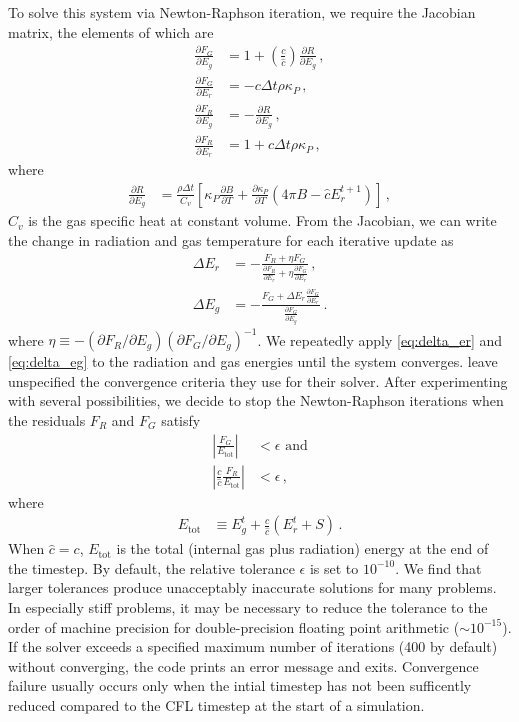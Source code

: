 \documentclass[fleqn,usenatbib]{mnras}
\begin{document}
To solve this system via Newton-Raphson iteration, we require the Jacobian matrix, the elements of which are
\begin{align}
\frac{\partial F_G}{\partial E_g} &= 1 + \left( \frac{c}{\hat c} \right) \frac{\partial R}{\partial E_g} \, , \\
\frac{\partial F_G}{\partial E_r} &= -c \Delta t \rho \kappa_P \, , \\
\frac{\partial F_R}{\partial E_g} &= -\frac{\partial R}{\partial E_g} \, , \\
\frac{\partial F_R}{\partial E_r} &= 1 + \hat c \Delta t \rho \kappa_P \, ,
\end{align}
where
\begin{align}
\frac{\partial R}{\partial E_g} &= \frac{\rho \Delta t}{C_v} \left[ \kappa_P \frac{\partial B}{\partial T} + \frac{\partial \kappa_P}{\partial T} \left( 4\pi B - \hat c E_r^{t+1} \right) \right] \, ,
\end{align}
$C_v$ is the gas specific heat at constant volume. From the Jacobian, we can write the change in radiation and gas temperature for each iterative update as
\begin{align}
\label{eq:delta_er}
\Delta E_r &= -\frac{F_R + \eta F_G}{ \frac{\partial F_R}{\partial E_r} + \eta \frac{\partial F_G}{\partial E_r} } \, , \\ 
\label{eq:delta_eg}
\Delta E_g &= -\frac{F_G + \Delta E_r \frac{\partial F_G}{\partial E_r}}{ \frac{\partial F_G}{\partial E_g} } \, .
\end{align}
where $\eta \equiv - (\partial F_R/\partial E_g) ( \partial F_G/\partial E_g )^{-1}$. We repeatedly apply \autoref{eq:delta_er} and \autoref{eq:delta_eg} to the radiation and gas energies until the system converges. \citet{Howell_2003} leave unspecified the convergence criteria they use for their solver. After experimenting with several possibilities, we decide to stop the Newton-Raphson iterations when the residuals $F_R$ and $F_G$ satisfy
\begin{align}
\left| \frac{F_G}{E_{\text{tot}}} \right| &< \epsilon \, \, \text{and} \\
\left| \frac{c}{\hat c} \frac{F_R}{E_{\text{tot}}} \right| &< \epsilon \, ,
\end{align}
where
\begin{align}
E_{\text{tot}} &\equiv E_g^t + \frac{c}{\hat c} \left( E_r^t + S \right) \, .
\end{align}
When $\hat c = c$, $E_{\text{tot}}$ is the total (internal gas plus radiation) energy at the end of the timestep. By default, the relative tolerance $\epsilon$ is set to $10^{-10}$. We find that larger tolerances produce unacceptably inaccurate solutions for many problems. In especially stiff problems, it may be necessary to reduce the tolerance to the order of machine precision for double-precision floating point arithmetic ($\sim 10^{-15}$). If the solver exceeds a specified maximum number of iterations (400 by default) without converging, the code prints an error message and exits. Convergence failure usually occurs only when the intial timestep has not been sufficently reduced compared to the CFL timestep at the start of a simulation.
\end{document}
